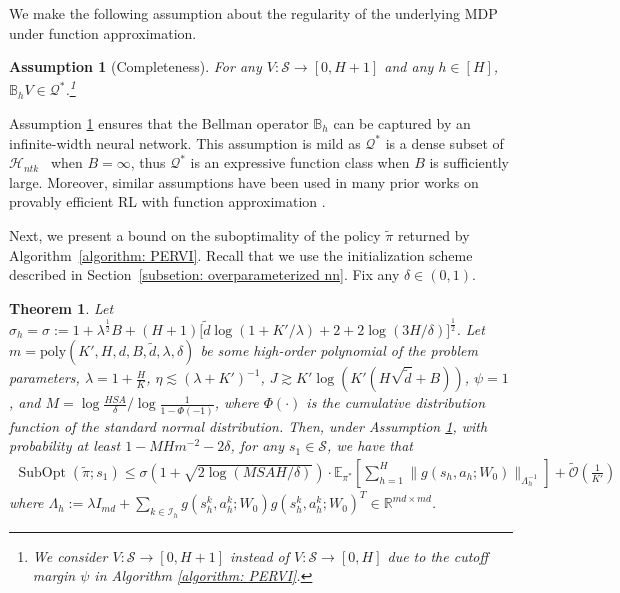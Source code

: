 \documentclass{article} \usepackage{iclr2023/iclr2023_conference,times}
\DeclareMathOperator*{\subopt}{SubOpt}
\newtheorem{assumption}{Assumption}[section]
\newtheorem{theorem}{Theorem}
\begin{document}
We make the following assumption about the regularity of the underlying MDP under function approximation. 
\begin{assumption}[Completeness]
For any $V: \mathcal{S} \rightarrow [0,H + 1]$ and any $h \in [H]$, $\mathbb{B}_h V \in \mathcal{Q}^*$.\footnote{We consider $V: \mathcal{S} \rightarrow [0,H + 1]$ instead of $V: \mathcal{S} \rightarrow [0,H]$ due to the cutoff margin $\psi$ in Algorithm \ref{algorithm: PERVI}.}
\label{assumption: completeness}
\end{assumption}
Assumption \ref{assumption: completeness} ensures that the Bellman operator $\mathbb{B}_h$ can be captured by an infinite-width neural network. This assumption is mild as  $\mathcal{Q}^*$ is a dense subset of $\mathcal{H}_{ntk}$~\citep[Lemma~C.1]{gao2019convergence} when $B = \infty$, thus $\mathcal{Q}^*$ is an expressive function class when $B$ is sufficiently large. Moreover, similar assumptions have been used in many prior works on provably efficient RL with function approximation \citep{cai2019neural,wang2020reinforcement,yang2020function,nguyentang2021sample}.

Next, we present a bound on the suboptimality of the policy $\tilde{\pi}$ returned by Algorithm~\ref{algorithm: PERVI}. Recall that we use the initialization scheme described in Section~\ref{subsetion: overparameterized nn}. Fix any $\delta \in (0,1)$. \
\begin{theorem}
Let $\sigma_h = \sigma:= 1 + \lambda^{\frac{1}{2}}  B + (H + 1) \big[ \textstyle {\tilde{d} \log (1 + K' / \lambda) + 2 + 2 \log (3 H / \delta)} \big]^{\frac{1}{2}}$.  
Let {$m = \textrm{poly}( K', H, d, B, \tilde{d}, \lambda, \delta)$ be some high-order polynomial of the problem parameters}, $\lambda = 1 + \frac{H}{K}$, $\eta \lesssim (\lambda + K')^{-1}$, $J \gtrsim K' \log (K'(H \sqrt{\tilde{d}} + B))$,
$\psi = 1$, 
and $M = \log \frac{HSA}{\delta} / \log \frac{1}{1 - \Phi(-1)}$, where $\Phi(\cdot)$ is the cumulative distribution function of the standard normal distribution. Then, under Assumption \ref{assumption: completeness}, with probability at least $1 -  MH m^{-2} - 2 \delta$, for any $s_1 \in \mathcal{S}$, we have that 
\begin{align*}
   \subopt(\tilde{\pi}; s_1) \leq \sigma (1 +  \sqrt{2 \log (MSAH / \delta)}  ) \cdot  \mathbb{E}_{\pi^*} \left[ \sum_{h=1}^H \| g(s_h, a_h; W_0) \|_{\Lambda_h^{-1}} \right] + \tilde{\mathcal{O}}(\frac{1}{K'})
\end{align*}
where $\Lambda_h := \lambda I_{md} + \sum_{k \in \mathcal{I}_h} g(s^k_h, a^k_h; W_0) g(s^k_h, a^k_h; W_0)^T \in \mathbb{R}^{md \times md }$.







\label{theorem: main theorem}
\end{theorem}
\end{document}
